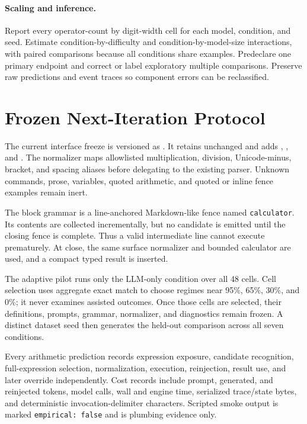 \documentclass[11pt]{article}
\begin{document}
\paragraph{Scaling and inference.}
Report every operator-count by digit-width cell for each model, condition, and
seed. Estimate condition-by-difficulty and condition-by-model-size interactions,
with paired comparisons because all conditions share examples. Predeclare one
primary endpoint and correct or label exploratory multiple comparisons. Preserve
raw predictions and event traces so component errors can be reclassified.

\section{Frozen Next-Iteration Protocol}

The current interface freeze is versioned as
. It retains
 unchanged and adds
,
, and
. The normalizer maps allowlisted multiplication,
division, Unicode-minus, bracket, and spacing aliases before delegating to the
existing  parser. Unknown commands, prose,
variables, quoted arithmetic, and quoted or inline fence examples remain inert.

The block grammar is a line-anchored Markdown-like fence named
\texttt{calculator}. Its contents are collected incrementally, but no candidate
is emitted until the closing fence is complete. Thus a valid intermediate line
cannot execute prematurely. At close, the same surface normalizer and bounded
calculator are used, and a compact typed result is inserted.

The adaptive pilot runs only the LLM-only condition over all 48 cells. Cell
selection uses aggregate exact match to choose regimes near 95\%, 65\%, 30\%,
and 0\%; it never examines assisted outcomes. Once those cells are selected,
their definitions, prompts, grammar, normalizer, and diagnostics remain frozen.
A distinct dataset seed then generates the held-out comparison across all seven
conditions.

Every arithmetic prediction records expression exposure, candidate recognition,
full-expression selection, normalization, execution, reinjection, result use,
and later override independently. Cost records include prompt, generated, and
reinjected tokens, model calls, wall and engine time, serialized trace/state
bytes, and deterministic invocation-delimiter characters. Scripted smoke output
is marked \texttt{empirical: false} and is plumbing evidence only.
\end{document}
